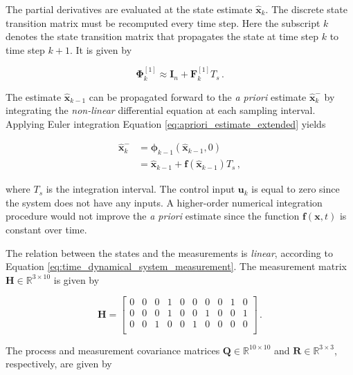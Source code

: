 \noindent
The partial derivatives are evaluated at the state estimate $\hat{\mathbf{x}}_{k}$. The discrete state transition matrix must be recomputed every time step. Here the subscript $k$ denotes the state transition matrix that propagates the state at time step $k$ to time step $k+1$. It is given by 

\begin{equation}
  \bm{\Phi}^{[1]}_{k} \approx \mathbf{I}_{n} + \mathbf{F}^{[1]}_k T_s\,.
\end{equation}

The estimate $\hat{\mathbf{x}}_{k-1}$ can be propagated forward to the \emph{a priori} estimate $\hat{\mathbf{x}}^{-}_k$ by integrating the \emph{non-linear} differential equation at each sampling interval. Applying Euler integration Equation \ref{eq:apriori_estimate_extended} yields

\begin{equation}\label{eq:apriori_estimate_extended_model}
\begin{split}
	\hat{\mathbf{x}}^{-}_k &= \bm{\phi}_{k-1}(\hat{\mathbf{x}}_{k-1}, 0) \\
	&= \hat{\mathbf{x}}_{k-1} + \mathbf{f}(\hat{\mathbf{x}}_{k-1})T_s\,, 
\end{split} 
\end{equation}

\noindent
where $T_s$ is the integration interval. The control input $\mathbf{u}_k$ is equal to zero since the system does not have any inputs. A higher-order numerical integration procedure would not improve the \emph{a priori} estimate since the function $\mathbf{f}(\mathbf{x}, t)$ is constant over time.

The relation between the states and the measurements is \emph{linear}, according to Equation \ref{eq:time_dynamical_system_measurement}. The measurement matrix $\mathbf{H} \in \mathbb{R}^{3 \times 10}$ is given by 

\begin{equation}
\mathbf{H} = \begin{bmatrix}
  0 & 0 & 0 & 1 & 0 & 0 & 0 & 0 & 1 & 0\\
  0 & 0 & 0 & 1 & 0 & 0 & 1 & 0 & 0 & 1\\
  0 & 0 & 1 & 0 & 0 & 1 & 0 & 0 & 0 & 0\\
\end{bmatrix}\,.
\end{equation}

The process and measurement covariance matrices $\mathbf{Q} \in \mathbb{R}^{10 \times 10}$ and $\mathbf{R} \in \mathbb{R}^{3 \times 3}$, respectively, are given by


